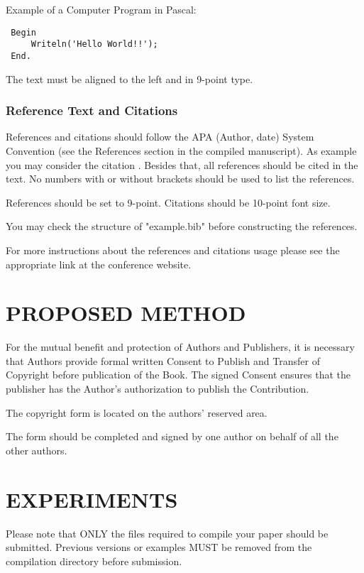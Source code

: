 \documentclass[a4paper,twoside]{article}
\begin{document}
Example of a Computer Program in Pascal:

\begin{small}
\begin{verbatim}
 Begin
     Writeln('Hello World!!');
 End.
\end{verbatim}
\end{small}


The text must be aligned to the left and in 9-point type.

\subsubsection{Reference Text and Citations}

References and citations should follow the APA (Author, date)
System Convention (see the References section in the compiled
manuscript). As example you may consider the citation
\cite{Smith98}. Besides that, all references should be cited in the
text. No numbers with or without brackets should be used to list the
references.

References should be set to 9-point. Citations should be 10-point
font size.

You may check the structure of "example.bib" before constructing the
references.

For more instructions about the references and citations usage
please see the appropriate link at the conference website.

\section{\uppercase{PROPOSED METHOD}}

For the mutual benefit and protection of Authors and
Publishers, it is necessary that Authors provide formal written
Consent to Publish and Transfer of Copyright before publication of
the Book. The signed Consent ensures that the publisher has the
Author's authorization to publish the Contribution.

The copyright form is located on the authors' reserved area.

The form should be completed and signed by one author on
behalf of all the other authors.

\section{\uppercase{EXPERIMENTS}}
\label{sec:experiments}

Please note that ONLY the files required to compile your paper should be submitted. Previous versions or examples MUST be removed from the compilation directory before submission.
\end{document}
